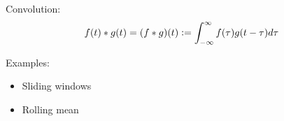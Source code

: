 




Convolution:
\begin{displaymath}
  f(t)\ast g(t) = (f\ast g)(t) \vcentcolon = \int_{-\infty}^{\infty} f(\tau) g(t-\tau) d\tau
\end{displaymath}

Examples:
\begin{itemize}
\item Sliding windows
\item Rolling mean
\end{itemize}



